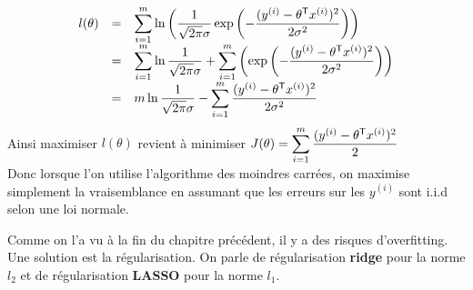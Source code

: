 $$ \begin{array}{lll}
	l(\theta)
	& = & \displaystyle \sum_{i = 1}^m \ln \left( \dfrac{1}{\sqrt{2 \pi} \sigma} \exp \left( - \dfrac{(y^{(i)} - \theta^{\mathsf{T}} x^{(i)})^2}{2 \sigma^2} \right) \right) \\
	& = & \displaystyle \sum_{i = 1}^m \ln \dfrac{1}{\sqrt{2 \pi} \sigma} + \sum_{i = 1}^m \left( \exp \left( - \dfrac{(y^{(i)} - \theta^{\mathsf{T}} x^{(i)})^2}{2 \sigma^2} \right) \right) \\
	& = & \displaystyle m \ln \dfrac{1}{\sqrt{2 \pi} \sigma} - \sum_{i = 1}^m \dfrac{(y^{(i)} - \theta^{\mathsf{T}} x^{(i)})^2}{2 \sigma^2}
\end{array} $$
Ainsi maximiser $l(\theta)$ revient à minimiser $\displaystyle J(\theta) = \sum_{i = 1}^m \dfrac{(y^{(i)} - \theta^{\mathsf{T}} x^{(i)})^2}{2}$ \\
Donc lorsque l'on utilise l'algorithme des moindres carrées, on maximise simplement la vraisemblance en assumant que les erreurs sur les $y^{(i)}$ sont i.i.d selon une loi normale.


Comme on l'a vu à la fin du chapitre précédent, il y a des risques d'overfitting. Une solution est la régularisation. On parle de régularisation \textbf{ridge} pour la norme $l_2$ et de régularisation \textbf{LASSO} pour la norme $l_1$.

